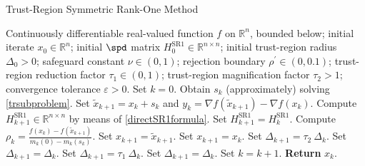 \begin{algorithm}[H]
    \caption{Trust-Region Symmetric Rank-One Method}\label{TR-SR1Method}
    \begin{algorithmic}[1]
        \State Continuously differentiable real-valued function $f$ on $\mathbb{R}^n$, bounded below; initial iterate $x_0 \in \mathbb{R}^n$; initial $\spd$ matrix $H^{\mathrm{SR1}}_0 \in \mathbb{R}^{n \times n}$; initial trust-region radius $\Delta_0 > 0$; safeguard constant $\nu \in (0,1)$; rejection boundary $\rho^{\prime} \in (0, 0.1)$; trust-region reduction factor $\tau_1 \in (0,1)$; trust-region magnification factor $\tau_2 > 1$; convergence tolerance $\varepsilon > 0$. Set $k = 0$.
            \State Obtain $s_k$ (approximately) solving \cref{trsubproblem}.
            \State Set $\widetilde{x}_{k+1} = x_k + s_k$ and $y_k = \nabla f(\widetilde{x}_{k+1}) - \nabla f(x_k)$.
                \State Compute $H^{\mathrm{SR1}}_{k+1} \in \mathbb{R}^{n \times n}$ by means of \cref{directSR1formula}.
			\Else 
				\State Set $H^{\mathrm{SR1}}_{k+1} = H^{\mathrm{SR1}}_k$.
            \EndIf 
            \State Compute $\rho_k = \frac{f(x_k) - f(\widetilde{x}_{k+1})}{m_k(0) - m_k(s_k)}$.
                \State Set $x_{k+1} = \widetilde{x}_{k+1}$.
			\Else 
				\State Set $x_{k+1} = x_k$.
            \EndIf 
                    \State Set $\Delta_{k+1} = \tau_2 \ \Delta_k$.
                \Else 
                    \State Set $\Delta_{k+1} = \Delta_k$.
                \EndIf 
			\Else 
                    \State Set $\Delta_{k+1} = \tau_1 \ \Delta_k$.
                \Else 
                    \State Set $\Delta_{k+1} = \Delta_k$.
                \EndIf 
            \EndIf 
            \State Set $k = k+1$.
        \EndWhile
        \State \textbf{Return} $x_k$.
    \end{algorithmic}
\end{algorithm}



